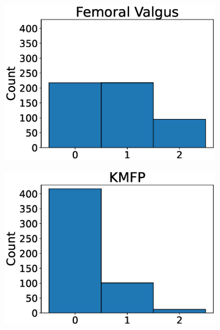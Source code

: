 \begin{figure}
\begin{subfigure}[t]{0.24\textwidth}
    \includegraphics[width=\textwidth]{files/figs/met/femval-label-hist.eps}
    \caption{}
    \label{fig:femval-labels}
  \end{subfigure}
  \begin{subfigure}[t]{0.24\textwidth}
    \includegraphics[width=\textwidth]{files/figs/met/kmfp-label-hist.eps}
    \caption{}
    \label{fig:kmfp-labels}
  \end{subfigure}


\end{figure}
